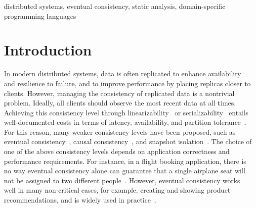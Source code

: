 \documentclass[numbers]{sigplanconf}
\begin{document}


\keywords
distributed systems, eventual consistency, static analysis, domain-specific programming languages

\section{Introduction}
In modern distributed systems, data is often replicated 
to enhance availability and resilience to failure, and to improve performance by
placing replicas closer to clients. However, managing the consistency of 
replicated data is a nontrivial problem. Ideally, all clients should observe
the most recent data at all times.
Achieving this consistency level through
linearizability~\cite{herlihy1990linearizability} or
serializability~\cite{papadimitriou1979serializability} entails
well-documented costs in terms of latency, availability, and partition
tolerance~\cite{bailis2013highly, kraska2013mdcc}. For this reason,
many weaker consistency levels have been proposed,
such as eventual consistency~\cite{vogels2009eventually}, causal
consistency~\cite{lamport1978time, schiper1989new}, and snapshot isolation~\cite{kemme2000database}.
The choice of one of the above consistency levels depends on application
correctness and performance requirements. For instance, in a flight booking
application, there is no way eventual consistency alone
can guarantee that a single airplane seat will not be assigned to two different
people~\cite{bailis2014coordination, bailis2013highly}. However, eventual
consistency works well
in many non-critical cases, for example, creating and showing product
recommendations, and is widely used in practice~\cite{eventualeBay,eventualNetflix,hastorun2007dynamo}.
\end{document}

